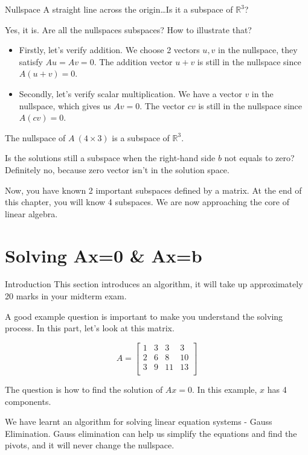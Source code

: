 \documentclass{beamer}
\begin{document}
\begin{frame}{Nullspace}
A straight line across the origin\dots Is it a subspace of $\mathbb{R}^3$?

\vspace{3pt}
Yes, it is. Are all the nullspaces subspaces? How to illustrate that?

\begin{itemize}
    \item Firstly, let's verify addition. We choose 2 vectors $u,v$ in the nullspace, they satisfy $Au=Av=0$. The addition vector $u+v$ is still in the nullspace since $A(u+v)=0$.
    \item Secondly, let's verify scalar multiplication. We have a vector $v$ in the nullspace, which gives us $Av=0$. The vector $cv$ is still in the nullspace since $A(cv)=0$.
\end{itemize}

The nullspace of $A\:(4\times3)$ is a subspace of $\mathbb{R}^3$.

\vspace{3pt}
Is the solutions still a subspace when the right-hand side $b$ not equals to zero? Definitely no, because zero vector isn't in the solution space.

\vspace{3pt}
Now, you have known 2 important subspaces defined by a matrix. At the end of this chapter, you will know 4 subspaces. We are now approaching the core of linear algebra.

\end{frame}

\section{Solving Ax=0 \& Ax=b}
\begin{frame}{Introduction}
This section introduces an algorithm, it will take up approximately 20 marks in your midterm exam.

\vspace{3pt}
A good example question is important to make you understand the solving process. In this part, let's look at this matrix.

\begin{equation*}
    A=\left[ \begin{matrix}
        1&		3&		3&		3\\
        2&		6&		8&		10\\
        3&		9&		11&		13\\
    \end{matrix} \right]
\end{equation*}

The question is how to find the solution of $Ax=0$. In this example, $x$ has 4 components.

\vspace{3pt}
We have learnt an algorithm for solving linear equation systems - Gauss Elimination. Gauss elimination can help us simplify the equations and find the pivots, and it will never change the nullspace.
\end{frame}
\end{document}
